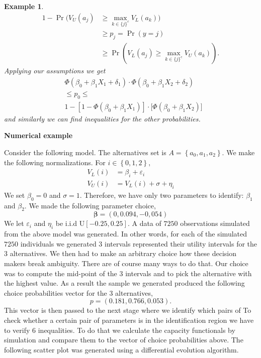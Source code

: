 \documentclass{article}
\newtheorem{example}{Example}
\begin{document}
\begin{example}
\begin{align*}
1-\Pr (V_{U}(a_{j})& \geq \underset{k\in \{j\}^{c}}{\max }V_{L}(a_{k})) \\
& \geq p_{j}=\Pr (y=j) \\
& \geq \Pr (V_{L}(a_{j})\geq \underset{k\in \{j\}^{c}}{\max }V_{U}(a_{k}))%
\text{.}
\end{align*}%
Applying our assumptions we get 
\begin{align*}
& \Phi (\beta _{0}+\beta _{1}X_{1}+\delta _{1})\cdot \Phi (\beta _{0}+\beta
_{1}X_{2}+\delta _{2}) \\
& \leq p_{0}\leq \\
& 1-[1-\Phi (\beta _{0}+\beta _{1}X_{1})]\cdot \lbrack \Phi (\beta
_{0}+\beta _{1}X_{2})]
\end{align*}%
and similarly we can find inequalities for the other probabilities.
\end{example}

\textbf{Numerical example}

Consider the following model. The alternatives set is $A=\left\{
a_{0},a_{1},a_{2}\right\} \text{.}$ We make the following normalizations.
For $i\in \left\{ 0,1,2\right\} \text{,}$ 
\begin{align}
V_{L}\left( i\right) & =\beta _{i}+\varepsilon _{i} \\
V_{U}\left( i\right) & =V_{L}\left( i\right) +\sigma +\eta _{i}
\end{align}%
We set $\beta _{0}=0$ and $\sigma =1$. Therefore, we have only two
parameters to identify: $\beta _{1}$ and $\beta _{2}$. We made the following
parameter choice,%
\begin{equation}
\mathbf{\beta }=\left( 0,0.094,-0,054\right)
\end{equation}%
We let $\varepsilon _{i}$ and $\eta _{i}$ be i.i.d U$\left[ -0.25,0.25\right]
$. A data of $7250$ observations simulated from the above model was
generated. In other words, for each of the simulated $7250$ individuals we
generated $3$ intervals represented their utility intervals for the $3$
alternatives. We then had to make an arbitrary choice how these decision
makers break ambiguity. There are of course many ways to do that. Our choice
was to compute the mid-point of the $3$ intervals and to pick the
alternative with the highest value. As a result the sample we generated
produced the following choice probabilities vector for the $3$ alternatives,%
\begin{equation}
p=\left( 0.181,0.766,0.053\right) .
\end{equation}%
This vector is then passed to the next stage where we identify which pairs
of To check whether a certain pair of parameters is in the identification
region we have to verify $6$ inequalities. To do that we calculate the
capacity functionals by simulation and compare them to the vector of choice
probabilities above. The following scatter plot was generated using a
differential evolution algorithm.
\end{document}
